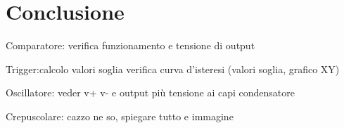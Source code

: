 \section*{Conclusione}

Comparatore: verifica funzionamento e tensione di output

Trigger:calcolo valori soglia verifica curva d’isteresi (valori soglia, grafico XY)

Oscillatore: veder v+ v- e output più tensione ai capi condensatore

Crepuscolare: cazzo ne so, spiegare tutto e immagine
